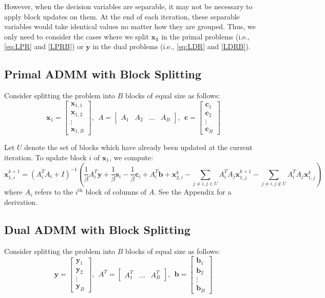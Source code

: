 \documentclass{article}
\begin{document}
However, when the decision variables are separable, it may not be necessary to apply block updates on them. At the end of each iteration, these separable variables would take identical values no matter how they are grouped. Thus, we only need to consider the cases where we split $\mathbf{x_1}$ in the primal problems (i.e.,  \eqref{eq:LPR} and \eqref{LPRB}) or $\mathbf{y}$ in the dual problems (i.e.,  \eqref{eq:LDR} and \eqref{LDRB}).

\subsection*{Primal ADMM with Block Splitting}

Consider splitting the problem into $B$ blocks of equal size as follows:
\[
\mathbf{x}_{1}=\begin{bmatrix}
\mathbf{x}_{1,1}\\
\mathbf{x}_{1,2}\\
\vdots \\
\mathbf{x}_{1,B}
\end{bmatrix},
 \ \  
A=\begin{bmatrix}A_{1} & A_{2} & \dots & A_{B} \end{bmatrix},
\ \ 
\mathbf{c}=\begin{bmatrix}
\mathbf{c}_{1}\\
\mathbf{c}_{2}\\
\vdots \\
\mathbf{c}_{B}
\end{bmatrix}
\]

Let $U$ denote the set of blocks which have already been updated at the current iteration. To update block $i$ of $\mathbf{x}_{1}$, we compute:
\[
\mathbf{x}_{1,i}^{k+1}=\left(A_{i}^{T}A_{i}+I\right)^{-1}\left(\frac{1}{\beta}A_{i}^{T}\mathbf{y}+\frac{1}{\beta}\mathbf{s}_{i}-\frac{1}{\beta}\mathbf{c}_{i}+A_{i}^{T}\mathbf{b}+\mathbf{x}_{2,i}^{k}-\sum_{j\neq i,j\in U}A_{i}^{T}A_{j}\mathbf{x}_{1,j}^{k+1}-\sum_{j\neq i,j\notin U}A_{i}^{T}A_{j}\mathbf{x}_{1,j}^{k}\right)
\]
where $A_{i}$ refers to the $i^{\text{th}}$ block of columns of $A$. See the Appendix for a derivation.

\subsection*{Dual ADMM with Block Splitting}

Consider splitting the problem into $B$ blocks of equal size as follows:
\[
\mathbf{y}=\begin{bmatrix}\mathbf{y}_{1}\\
\mathbf{y}_{2}\\
\vdots \\
\mathbf{y}_{B}
\end{bmatrix},
\ \
A^{T}=\begin{bmatrix}A_{1}^{T} & \dots & A_{B}^{T}\end{bmatrix},
\ \ 
\mathbf{b}=\begin{bmatrix}\mathbf{b}_{1}\\
\mathbf{b}_{2} \\
\vdots \\
\mathbf{b}_{B}
\end{bmatrix}
\]
\end{document}
